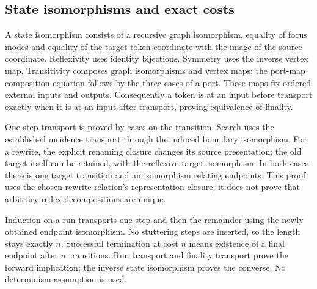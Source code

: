 

\subsection{State isomorphisms and exact costs}

A state isomorphism consists of a recursive graph isomorphism, equality of
focus modes and equality of the target token coordinate with the image of
the source coordinate. Reflexivity uses identity bijections. Symmetry uses
the inverse vertex map. Transitivity composes graph isomorphisms and vertex
maps; the port-map composition equation follows by the three cases of a
port. These maps fix ordered external inputs and outputs. Consequently a
token is at an input before transport exactly when it is at an input after
transport, proving equivalence of finality.






One-step transport is proved by cases on the transition. Search uses
the established incidence transport through the induced boundary isomorphism.
For a rewrite, the explicit renaming closure changes its source presentation;
the old target itself can be retained, with the reflexive target isomorphism.
In both cases there is one target transition and an isomorphism relating
endpoints. This proof uses the chosen rewrite relation's representation
closure; it does not prove that arbitrary redex decompositions are unique.


Induction on a run transports one step and then the remainder using
the newly obtained endpoint isomorphism. No stuttering steps are inserted,
so the length stays exactly $n$. Successful termination at cost $n$ means
existence of a final endpoint after $n$ transitions. Run transport and finality
transport prove the forward implication; the inverse state isomorphism proves
the converse. No determinism assumption is used.

